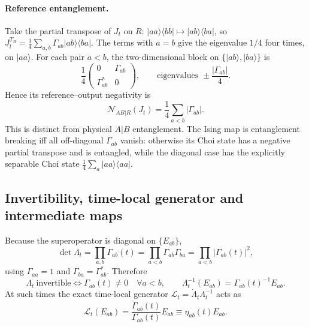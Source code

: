 \documentclass[11pt,a4paper]{article}
\newcommand{\ket}[1]{\lvert #1\rangle}
\newcommand{\bra}[1]{\langle #1\rvert}
\begin{document}
\paragraph{Reference entanglement.}
Take the partial transpose of $J_t$ on $R$:
$\ket{aa}\bra{bb}\mapsto\ket{ab}\bra{ba}$, so
$J_t^{T_R}=\frac14\sum_{a,b}\Gamma_{ab}\ket{ab}\bra{ba}$. The terms with
$a=b$ give the eigenvalue $1/4$ four times, on $\ket{aa}$. For each pair
$a<b$, the two-dimensional block on $\{\ket{ab},\ket{ba}\}$ is
\begin{equation}
 \frac14\begin{pmatrix}0&\Gamma_{ab}\\\Gamma_{ab}^*&0\end{pmatrix},
 \qquad\text{eigenvalues }\pm\frac{|\Gamma_{ab}|}{4}.
\end{equation}
Hence its reference--output negativity is
\begin{equation}
 \mathcal N_{AB|R}(J_t)=\frac14\sum_{a<b}|\Gamma_{ab}|.
\end{equation}
This is distinct from physical $A|B$ entanglement. The Ising map is
entanglement breaking iff all off-diagonal $\Gamma_{ab}$ vanish:
otherwise its Choi state has a negative partial transpose and is
entangled, while the diagonal case has the explicitly separable Choi
state $\frac14\sum_a\ket{aa}\bra{aa}$.

\subsection{Invertibility, time-local generator and intermediate maps}
\label{sec:invertibility}

Because the superoperator is diagonal on $\{E_{ab}\}$,
\begin{equation}
 \det\Lambda_t=\prod_{a,b}\Gamma_{ab}(t)
 =\prod_{a<b}\Gamma_{ab}\Gamma_{ba}=\prod_{a<b}|\Gamma_{ab}(t)|^2 ,
\end{equation}
using $\Gamma_{aa}=1$ and $\Gamma_{ba}=\Gamma_{ab}^*$. Therefore
\begin{equation}
 \Lambda_t\ \text{invertible}\iff\Gamma_{ab}(t)\ne0\quad\forall a<b,
 \qquad \Lambda_t^{-1}(E_{ab})=\Gamma_{ab}(t)^{-1}E_{ab}.
\end{equation}
At such times the exact time-local generator
$\mathcal L_t=\dot\Lambda_t\Lambda_t^{-1}$ acts as
\begin{equation}
 \mathcal L_t(E_{ab})=\frac{\dot\Gamma_{ab}(t)}{\Gamma_{ab}(t)}E_{ab}
 \equiv\eta_{ab}(t)E_{ab}.
 \label{eq:generatorschur}
\end{equation}
\end{document}
